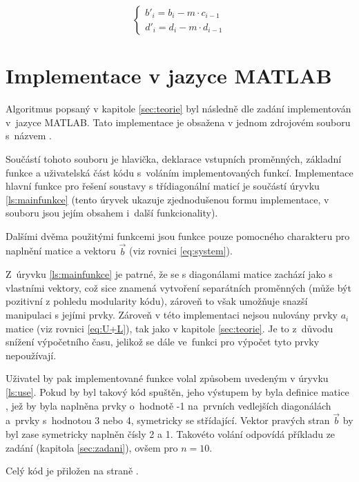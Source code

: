 \documentclass[12pt]{CLASS/protokol}
\begin{document}
        \begin{equation}\label{eq:koeficienty}
            \begin{cases}
              b'_i=b_i−m\cdot c_{i−1}\\
              d'_i=d_i−m \cdot d_{i−1}
            \end{cases}
        \end{equation}


\section{Implementace v jazyce MATLAB}
    Algoritmus popsaný v kapitole \ref{sec:teorie} byl následně dle zadání implementován v~jazyce MATLAB. Tato implementace je obsažena v jednom zdrojovém souboru s~názvem .
    \par
    Součástí tohoto souboru je hlavička, deklarace vstupních proměnných, základní funkce a uživatelská část kódu s~voláním implementovaných funkcí. Implementace hlavní funkce pro řešení soustavy s třídiagonální maticí je součástí úryvku \ref{ls:mainfunkce} (tento úryvek ukazuje zjednodušenou formu implementace, v souboru  jsou jejím obsahem i~další funkcionality).
    \par
    Dalšími dvěma použitými funkcemi jsou funkce pouze pomocného charakteru pro naplnění matice  a vektoru $\vec{b}$ (viz rovnici \ref{eq:system}).
    \par
    Z~úryvku \ref{ls:mainfunkce} je patrné, že se s diagonálami matice zachází jako s vlastními vektory, což sice znamená vytvoření separátních proměnných (může být pozitivní z pohledu modularity kódu), zároveň to však umožňuje snazší manipulaci s jejími prvky. Zároveň v této implementaci nejsou nulovány prvky $a_i$ matice  (viz rovnici \ref{eq:U+L}), tak jako v kapitole \ref{sec:teorie}. Je to z~důvodu snížení výpočetního času, jelikož se dále ve~funkci pro výpočet tyto prvky nepoužívají.
    \par
    Uživatel by pak implementované funkce volal způsobem uvedeným v úryvku \ref{ls:use}. Pokud by byl takový kód spuštěn, jeho výstupem by byla definice matice , jež by byla naplněna prvky o~hodnotě -1 na~prvních vedlejších diagonálách a~prvky s~hodnotou 3 nebo 4, symetricky se střídající. Vektor pravých stran $\vec{b}$ by byl zase symetricky naplněn čísly 2 a 1. Takovéto volání odpovídá příkladu ze zadání (kapitola \ref{sec:zadani}), ovšem pro $n=10$.
    \par
    Celý kód je přiložen na straně \pageref{ls:uf}.
\end{document}

